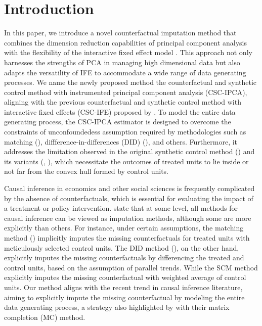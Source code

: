 \documentclass[12pt]{article}
\begin{document}
\doublespacing

\section{Introduction} 
\label{sec:introduction}
In this paper, we introduce a novel counterfactual imputation method that combines the dimension reduction capabilities of principal component analysis \cite{jollife2016principal} with the flexibility of the interactive fixed effect model \cite{bai2003computation,bai2009panel}. This approach not only harnesses the strengths of PCA in managing high dimensional data but also adapts the versatility of IFE to accommodate a wide range of data generating processes. We name the newly proposed method the counterfactual and synthetic control method with instrumented principal component analysis (CSC-IPCA), aligning with the previous counterfactual and synthetic control method with interactive fixed effects (CSC-IFE) proposed by \cite{xu2017generalized}. To model the entire data generating process, the CSC-IPCA estimator is designed to overcome the constraints of unconfoundedess assumption required by methodologies such as matching (\cite{abadie2011bias, abadie2006large}), diffference-in-differences (DID) (\cite{card1993minimum}), and others. Furthermore, it addresses the limitation observed in the original synthetic control method (\cite{abadie2010synthetic}) and its variants (\cite{ben2021augmented}, \cite{arkhangelsky2021synthetic}), which necessitate the outcomes of treated units to lie inside or not far from the convex hull formed by control units. 

Causal inference in economics and other social sciences is frequently complicated by the absence of counterfactuals, which is essential for evaluating the impact of a treatment or policy intervention. \cite{imbens2015causal} state that at some level, all methods for causal inference can be viewed as imputation methods, although some are more explicitly than others. For instance, under certain assumptions, the matching method (\cite{abadie2006large, abadie2011bias}) implicitly imputes the missing counterfactuals for treated units with meticulously selected control units. The DID method (\cite{card1993minimum, ashenfelter1978estimating}), on the other hand, explicitly imputes the missing counterfactuals by differencing the treated and control units, based on the assumption of parallel trends. While the SCM method explicitly imputes the missing counterfactual with weighted average of control units. Our method aligns with the recent trend in causal inference literature, aiming to explicitly impute the missing counterfactual by modeling the entire data generating process, a strategy also highlighted by \cite{athey2021matrix} with their matrix completion (MC) method.
\end{document}
